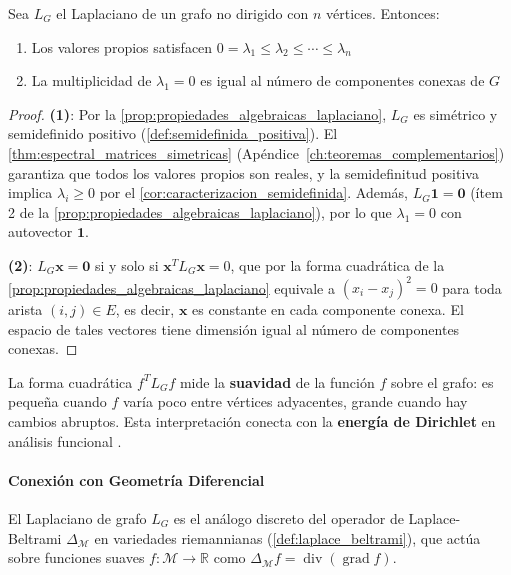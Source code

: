 \begin{proposition}\label{prop:propiedades_espectrales_laplaciano_grafos}
	Sea $L_G$ el Laplaciano de un grafo no dirigido con $n$ vértices. Entonces:
	\begin{enumerate}
		\item Los valores propios satisfacen $0 = \lambda_1 \leq \lambda_2 \leq \cdots \leq \lambda_n$
		\item La multiplicidad de $\lambda_1 = 0$ es igual al número de componentes conexas de $G$
	\end{enumerate}
\end{proposition}

\begin{proof}
	\textbf{(1)}: Por la \autoref{prop:propiedades_algebraicas_laplaciano}, $L_G$ es simétrico y semidefinido positivo (\autoref{def:semidefinida_positiva}). El \autoref{thm:espectral_matrices_simetricas} (Apéndice~\ref{ch:teoremas_complementarios}) garantiza que todos los valores propios son reales, y la semidefinitud positiva implica $\lambda_i \geq 0$ por el \autoref{cor:caracterizacion_semidefinida}. Además, $L_G \mathbf{1} = \mathbf{0}$ (ítem 2 de la \autoref{prop:propiedades_algebraicas_laplaciano}), por lo que $\lambda_1 = 0$ con autovector $\mathbf{1}$.

	\textbf{(2)}: $L_G \mathbf{x} = \mathbf{0}$ si y solo si $\mathbf{x}^T L_G \mathbf{x} = 0$, que por la forma cuadrática de la \autoref{prop:propiedades_algebraicas_laplaciano} equivale a $(x_i - x_j)^2 = 0$ para toda arista $(i,j) \in E$, es decir, $\mathbf{x}$ es constante en cada componente conexa. El espacio de tales vectores tiene dimensión igual al número de componentes conexas.
\end{proof}

La forma cuadrática $f^T L_G f$ mide la \textbf{suavidad} de la función $f$ sobre el grafo: es pequeña cuando $f$ varía poco entre vértices adyacentes, grande cuando hay cambios abruptos. Esta interpretación conecta con la \textbf{energía de Dirichlet} en análisis funcional \citep[Cap.~1]{Chung1997}.

\paragraph{Conexión con Geometría Diferencial}

El Laplaciano de grafo $L_G$ es el análogo discreto del operador de Laplace-Beltrami $\Delta_\mathcal{M}$ en variedades riemannianas (\autoref{def:laplace_beltrami}), que actúa sobre funciones suaves $f: \mathcal{M} \to \mathbb{R}$ como $\Delta_\mathcal{M} f = \operatorname{div}(\operatorname{grad} f)$.

